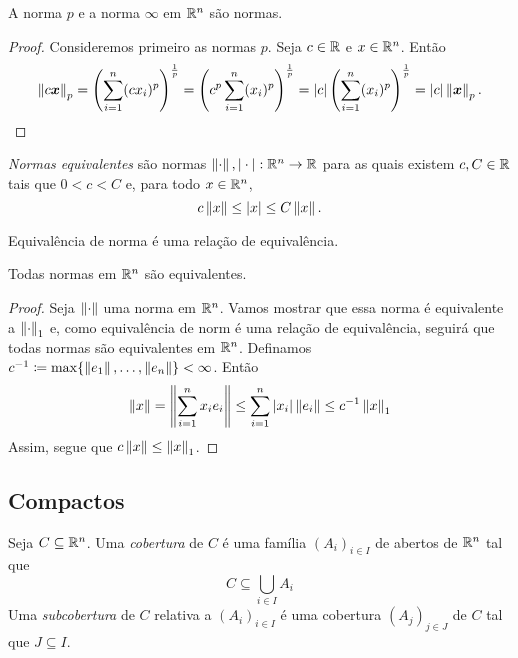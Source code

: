 \begin{prop}
	A norma $p$ e a norma $\infty$ em $\mathbb{R}^n$ são normas.
\end{prop}
\begin{proof}
	Consideremos primeiro as normas $p$. Seja $c \in \mathbb{R}$ e $x \in \mathbb{R}^n$. Então
	\begin{equation*}
	\left\Vert{c\bm x}\right\Vert_p = \left( \sum_{i=1}^n (cx_i)^p \right)^{\frac{1}{p}} = \left(c^p \sum_{i=1}^n (x_i)^p \right)^{\frac{1}{p}} = |c| \left( \sum_{i=1}^n (x_i)^p \right)^{\frac{1}{p}} = |c|\left\Vert{\bm x}\right\Vert_p .
	\end{equation*}
	
\end{proof}


\begin{defi}
	\emph{Normas equivalentes} são normas $\left\Vert{\cdot}\right\Vert, |\cdot|: \mathbb{R}^n \to \mathbb{R}$ para as quais existem $c,C \in \mathbb{R}$ tais que $0 < c < C$ e, para todo $x \in \mathbb{R}^n$,
	\begin{equation*}
	c \left\Vert{x}\right\Vert \leq |x| \leq C \left\Vert{x}\right\Vert.
	\end{equation*}
\end{defi}

\begin{prop}
Equivalência de norma é uma relação de equivalência.
\end{prop}

\begin{prop}
	Todas normas em $\mathbb{R}^n$ são equivalentes.
\end{prop}
\begin{proof}
	Seja $\left\Vert{\cdot}\right\Vert$ uma norma em $\mathbb{R}^n$. Vamos mostrar que essa norma é equivalente a $\left\Vert{\cdot}\right\Vert_1$ e, como equivalência de norm é uma relação de equivalência, seguirá que todas normas são equivalentes em $\mathbb{R}^n$. Definamos $c^{-1} \coloneqq \max\{\left\Vert{e_1}\right\Vert,\ldots,\left\Vert{e_n}\right\Vert\} < \infty$. Então
	\begin{equation*}
	\left\Vert{x}\right\Vert = \left\Vert{\sum_{i=1}^n x_i e_i}\right\Vert \leq \sum_{i=1}^n |x_i|\left\Vert{e_i}\right\Vert \leq c^{-1} \left\Vert{x}\right\Vert_1
	\end{equation*}
	Assim, segue que $c \left\Vert{x}\right\Vert \leq \left\Vert{x}\right\Vert_1$.
\end{proof}


\subsection{Compactos}

\begin{defi}
	Seja $C \subseteq \mathbb{R}^n$. Uma \emph{cobertura} de $C$ é uma família $(A_i)_{i \in I}$ de abertos de $\mathbb{R}^n$ tal que
	\begin{equation*}
	C \subseteq \bigcup_{i \in I} A_i
	\end{equation*}
	Uma \emph{subcobertura} de $C$ relativa a $(A_i)_{i \in I}$ é uma cobertura $(A_j)_{j \in J}$ de $C$ tal que $J \subseteq I$.
\end{defi}

